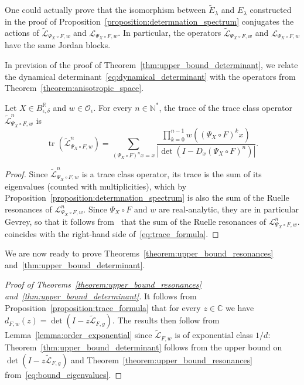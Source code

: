 \documentclass[AHL,Unicode,longabstracts,published]{cedram}
\DeclareMathOperator{\tr}{tr}
\newcommand{\p}[1]{\left(#1\right)}
\newcommand{\va}[1]{\left|#1\right|}
\newcommand{\clO}{\mathcal{O}}
\newcommand{\clL}{\mathcal{L}}
\newcommand{\bbC}{\mathbb{C}}
\newcommand{\bbN}{\mathbb{N}}
\newcommand{\bbR}{\mathbb{R}}
\newcommand*{\MK}{\mkern 2mu}
\newcommand{\clO}{\mathcal{O}}
\begin{document}
\begin{rema}
One could actually prove that the isomorphism between $\widetilde{E}_\lambda$ and $E_\lambda$ constructed in the proof of Proposition~\ref{proposition:determnation_spectrum} conjugates the actions of $\widetilde{\clL}_{\Psi_X \circ F,w}$ and $\clL_{\Psi_X \circ F,w}$. In particular, the operators $\widetilde{\clL}_{\Psi_X \circ F,w}$ and $\clL_{\Psi_X \circ F,w}$ have the same Jordan blocks.
\end{rema}

In prevision of the proof of Theorem~\ref{thm:upper_bound_determinant}, we relate the dynamical determinant~\eqref{eq:dynamical_determinant} with the operators from Theorem~\ref{theorem:anisotropic_space}.

\begin{prop}\label{proposition:trace_formula}
Let $X \in B_{\epsilon,\delta}^{\bbR}$ and $w \in \clO_\epsilon$. For every $n \in \bbN^*$, the trace of the trace class operator $\widetilde{\clL}_{\Psi_X \circ F,w}^n$ is
\begin{equation}\label{eq:trace_formula}
\tr\p{\widetilde{\clL}_{\Psi_X \circ F,w}^n} = \sum_{\left(\Psi_X \circ F\right)^n x = x} \frac{\prod_{k = 0}^{n-1} w\left(\left(\Psi_X \circ F\right)^k x\right)}{\va{\det\p{ I - D_x (\Psi_X \circ F)^n}}}.
\end{equation}
\end{prop}

\begin{proof}
Since $\widetilde{\clL}_{\Psi_X \circ F,w}^n$ is a trace class operator, its trace is the sum of its eigenvalues (counted with multiplicities), which by Proposition~\ref{proposition:determnation_spectrum} is also the sum of the Ruelle resonances of $\clL_{\Psi_X \circ F,w}^n$. Since $\Psi_X \circ F$ and $w$ are real-analytic, they are in particular Gevrey, so that it follows from~\cite[Theorem~2.12$\MK$(iv)]{local_and_global} that the sum of the Ruelle resonances of $\clL_{\Psi_X \circ F,w}^n$. coincides with the right-hand side of~\eqref{eq:trace_formula}.
\end{proof}

We are now ready to prove Theorems~\ref{theorem:upper_bound_resonances} and~\ref{thm:upper_bound_determinant}.

\begin{proof}[Proof of Theorems~\ref{theorem:upper_bound_resonances} and~\ref{thm:upper_bound_determinant}]
It follows from Proposition~\ref{proposition:trace_formula} that for every $z \in \bbC$ we have $d_{F,w}(z) = \det(I - z \widetilde{\clL}_{F,g})$. The results then follow from Lemma~\ref{lemma:order_exponential} since $\widetilde{\clL}_{F,w}$ is of exponential class $1/d$: Theorem~\ref{thm:upper_bound_determinant} follows from the upper bound on $\det(I - z \widetilde{\clL}_{F,g})$ and Theorem~\ref{theorem:upper_bound_resonances} from~\eqref{eq:bound_eigenvalues}.
\end{proof}
\end{document}
